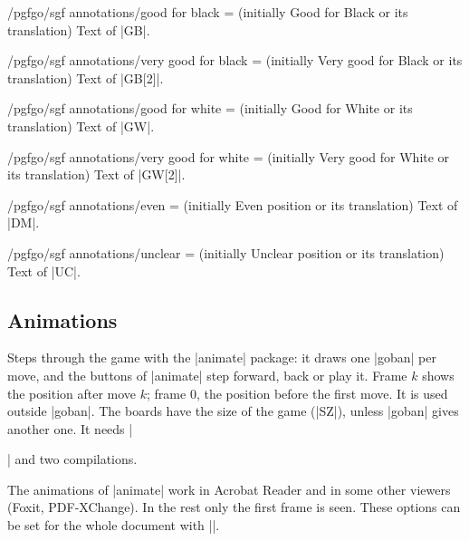\begin{key}{/pgfgo/sgf annotations/good for black =  (initially Good for Black or its translation)}
	Text of |GB|.
\end{key}

\begin{key}{/pgfgo/sgf annotations/very good for black =  (initially Very good for Black or its translation)}
	Text of |GB[2]|.
\end{key}

\begin{key}{/pgfgo/sgf annotations/good for white =  (initially Good for White or its translation)}
	Text of |GW|.
\end{key}

\begin{key}{/pgfgo/sgf annotations/very good for white =  (initially Very good for White or its translation)}
	Text of |GW[2]|.
\end{key}

\begin{key}{/pgfgo/sgf annotations/even =  (initially Even position or its translation)}
	Text of |DM|.
\end{key}

\begin{key}{/pgfgo/sgf annotations/unclear =  (initially Unclear position or its translation)}
	Text of |UC|.
\end{key}

\subsection{Animations}
\label{subsec:sgfanimacion}

\begin{command}{\sgfanimation{}}

	Steps through the game with the |animate| package: it draws one |goban| per move, and the buttons of |animate| step forward, back or play it. Frame $k$ shows the position after move $k$; frame 0, the position before the first move. It is used outside |goban|. The boards have the size of the game (|SZ|), unless |goban| gives another one. It needs |\usepackage{animate}| and two compilations.
\end{command}

The animations of |animate| work in Acrobat Reader and in some other viewers (Foxit, PDF-XChange). In the rest only the first frame is seen. These options can be set for the whole document with ||.

